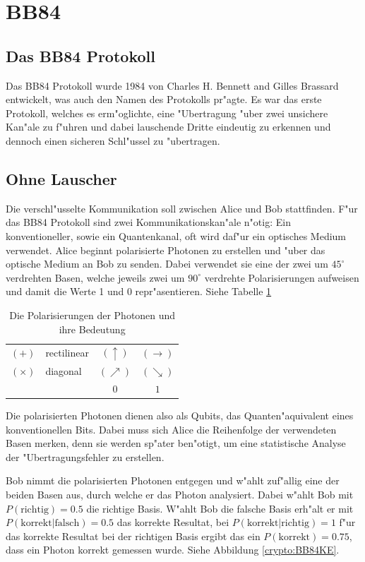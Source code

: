 \section{BB84}
  \subsection{Das BB84 Protokoll}
  Das BB84 Protokoll wurde 1984 von Charles H. Bennett and Gilles Brassard entwickelt,
  was auch den Namen des Protokolls pr"agte.
  Es war das erste Protokoll, welches es erm"oglichte, eine "Ubertragung "uber zwei unsichere Kan"ale zu f"uhren
  und dabei lauschende Dritte eindeutig zu erkennen und dennoch einen sicheren Schl"ussel zu "ubertragen.

  \subsection{Ohne Lauscher}
  Die verschl"usselte Kommunikation soll zwischen Alice und Bob stattfinden.
  F"ur das BB84 Protokoll sind zwei Kommunikationskan"ale n"otig:
  Ein konventioneller, sowie ein Quantenkanal, oft wird daf"ur ein optisches Medium verwendet.
  Alice beginnt polarisierte Photonen zu erstellen und "uber das optische Medium an Bob zu senden.
  Dabei verwendet sie eine der zwei um $45^{\circ}$ verdrehten Basen,
  welche jeweils zwei um $90^{\circ}$ verdrehte Polarisierungen aufweisen und damit die Werte 1 und 0 repr"asentieren. Siehe Tabelle \ref{crypto:poltab}

  \begin{table}
    \centering
    \begin{tabular}{l l || c c}
      \hline
      $(+)$ & rectilinear & $(\uparrow)$ & $(\rightarrow)$\\
      $(\times)$ & diagonal & $(\nearrow)$ & $(\searrow)$\\
      \hline
      & & $0$ & $1$\\
      \hline
    \end{tabular}
    \caption{Die Polarisierungen der Photonen und ihre Bedeutung\label{crypto:poltab}}
  \end{table}

  Die polarisierten Photonen dienen also als Qubits, das Quanten"aquivalent eines konventionellen Bits.
  Dabei muss sich Alice die Reihenfolge der verwendeten Basen merken,
  denn sie werden sp"ater ben"otigt, um eine statistische Analyse der "Ubertragungsfehler zu erstellen.

  Bob nimmt die polarisierten Photonen entgegen und w"ahlt zuf"allig eine der beiden Basen aus, durch welche er das Photon analysiert.
  Dabei w"ahlt Bob mit
  $P(\text{richtig})=0.5$
  die richtige Basis.
  W"ahlt Bob die falsche Basis erh"alt er mit
  $P(\text{korrekt}|\text{falsch})=0.5$
  das korrekte Resultat, bei
  $P(\text{korrekt}|\text{richtig})=1$
  f"ur das korrekte Resultat bei der richtigen Basis ergibt das ein
  $P(\text{korrekt})=0.75$,
  dass ein Photon korrekt gemessen wurde.
  Siehe Abbildung \ref{crypto:BB84KE}.

